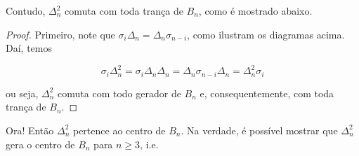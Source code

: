 	
	
	\par\vspace{0.3cm} Contudo, $\Delta_n^2$ comuta com toda trança de $B_n$, como é mostrado abaixo.
	
	\begin{proof}
		
		
		
		Primeiro, note que $\sigma_i\Delta_n = \Delta_n\sigma_{n-i}$, como ilustram os diagramas acima. Daí, temos
		
		\begin{equation*}
		\sigma_i\Delta_n^2 = \sigma_i\Delta_n\Delta_n = \Delta_n\sigma_{n-i}\Delta_n = \Delta_n^2\sigma_i
		\end{equation*}
		
		\par\vspace{0.3cm} ou seja, $\Delta_n^2$ comuta com todo gerador de $B_n$ e, consequentemente, com toda trança de $B_n$.
		
		\par\vspace{0.3cm} 
		
	\end{proof}
	
	\par\vspace{0.3cm} Ora! Então $\Delta_n^2$ pertence ao centro de $B_n$. Na verdade, é possível mostrar que $\Delta_n^2$ gera o centro de $B_n$ para $n\geq 3$, i.e.
	
